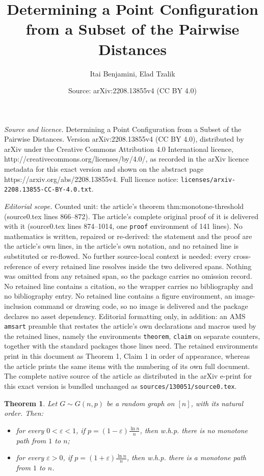 \documentclass[10pt,a4paper]{amsart}
\title{Determining a Point Configuration from a Subset of the Pairwise Distances}
\author{Itai Benjamini, Elad Tzalik}
\date{Source: arXiv:2208.13855v4 (CC BY 4.0)}
\newtheorem{theorem}{Theorem}
\begin{document}
\maketitle

\noindent\emph{Source and licence.} Determining a Point Configuration from a Subset of the Pairwise Distances. Version arXiv:2208.13855v4 (CC BY 4.0), distributed by arXiv under the Creative Commons Attribution 4.0 International licence, http://creativecommons.org/licenses/by/4.0/, as recorded in the arXiv licence metadata for this exact version and shown on the abstract page https://arxiv.org/abs/2208.13855v4. Full licence notice: \texttt{licenses/arxiv-2208.13855-CC-BY-4.0.txt}.\par\smallskip

\noindent\textit{Editorial scope.} Counted unit: the article's theorem thm:monotone-threshold (source0.tex lines 866--872). The article's complete original proof of it is delivered with it (source0.tex lines 874--1014, one \texttt{proof} environment of 141 lines). No mathematics is written, repaired or re-derived: the statement and the proof are the article's own lines, in the article's own notation, and no retained line is substituted or re-flowed.  No further source-local context is needed: every cross-reference of every retained line resolves inside the two delivered spans.  Nothing was omitted from any retained span, so the package carries no omission record.  No retained line contains a citation, so the wrapper carries no bibliography and no bibliography entry.  No retained line contains a figure environment, an image-inclusion command or drawing code, so no image is delivered and the package declares no asset dependency.  Editorial formatting only, in addition: an AMS \texttt{amsart} preamble that restates the article's own declarations and macros used by the retained lines, namely the environments \texttt{theorem}, \texttt{claim} on separate counters, together with the standard packages those lines need.  The retained environments print in this document as Theorem 1, Claim 1 in order of appearance, whereas the article prints the same items with the numbering of its own full document.  The complete native source of the article as distributed in the arXiv e-print for this exact version is bundled unchanged as \texttt{sources/130051/source0.tex}.
\begin{theorem}\label{thm:monotone-threshold}
Let \(G \sim G(n,p)\) be a random graph on \([n]\), with its natural order. Then:
\begin{itemize}
    \item for every \(0<\varepsilon<1\), if \(p=(1-\varepsilon)\frac{\ln n}{n}\), then w.h.p. there is no monotone path from \(1\) to \(n\);
    \item for every \(\varepsilon>0\), if \(p=(1+\varepsilon)\frac{\ln n}{n}\), then w.h.p. there is a monotone path from \(1\) to \(n\).
\end{itemize}
\end{theorem}
\end{document}
